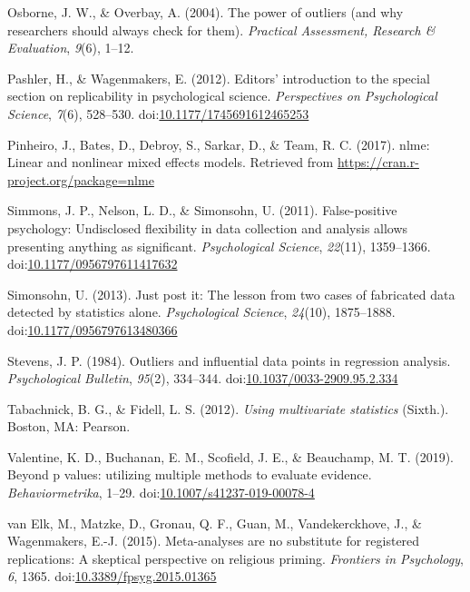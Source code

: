 \documentclass[english,,man]{apa6}
\theoremstyle{definition}
\theoremstyle{definition}
\theoremstyle{definition}
\theoremstyle{remark}
\begin{document}
\hypertarget{ref-Osborne2004}{}
Osborne, J. W., \& Overbay, A. (2004). The power of outliers (and why
researchers should always check for them). \emph{Practical Assessment,
Research \& Evaluation}, \emph{9}(6), 1--12.

\hypertarget{ref-Pashler2012a}{}
Pashler, H., \& Wagenmakers, E. (2012). Editors' introduction to the
special section on replicability in psychological science.
\emph{Perspectives on Psychological Science}, \emph{7}(6), 528--530.
doi:\href{https://doi.org/10.1177/1745691612465253}{10.1177/1745691612465253}

\hypertarget{ref-Pinheiro2017}{}
Pinheiro, J., Bates, D., Debroy, S., Sarkar, D., \& Team, R. C. (2017).
nlme: Linear and nonlinear mixed effects models. Retrieved from
\url{https://cran.r-project.org/package=nlme}

\hypertarget{ref-Simmons2011}{}
Simmons, J. P., Nelson, L. D., \& Simonsohn, U. (2011). False-positive
psychology: Undisclosed flexibility in data collection and analysis
allows presenting anything as significant. \emph{Psychological Science},
\emph{22}(11), 1359--1366.
doi:\href{https://doi.org/10.1177/0956797611417632}{10.1177/0956797611417632}

\hypertarget{ref-Simonsohn2013}{}
Simonsohn, U. (2013). Just post it: The lesson from two cases of
fabricated data detected by statistics alone. \emph{Psychological
Science}, \emph{24}(10), 1875--1888.
doi:\href{https://doi.org/10.1177/0956797613480366}{10.1177/0956797613480366}

\hypertarget{ref-Stevens1984}{}
Stevens, J. P. (1984). Outliers and influential data points in
regression analysis. \emph{Psychological Bulletin}, \emph{95}(2),
334--344.
doi:\href{https://doi.org/10.1037/0033-2909.95.2.334}{10.1037/0033-2909.95.2.334}

\hypertarget{ref-Tabachnick2012}{}
Tabachnick, B. G., \& Fidell, L. S. (2012). \emph{Using multivariate
statistics} (Sixth.). Boston, MA: Pearson.

\hypertarget{ref-Valentine2017}{}
Valentine, K. D., Buchanan, E. M., Scofield, J. E., \& Beauchamp, M. T.
(2019). Beyond p values: utilizing multiple methods to evaluate
evidence. \emph{Behaviormetrika}, 1--29.
doi:\href{https://doi.org/10.1007/s41237-019-00078-4}{10.1007/s41237-019-00078-4}

\hypertarget{ref-VanElk2015}{}
van Elk, M., Matzke, D., Gronau, Q. F., Guan, M., Vandekerckhove, J., \&
Wagenmakers, E.-J. (2015). Meta-analyses are no substitute for
registered replications: A skeptical perspective on religious priming.
\emph{Frontiers in Psychology}, \emph{6}, 1365.
doi:\href{https://doi.org/10.3389/fpsyg.2015.01365}{10.3389/fpsyg.2015.01365}
\end{document}
